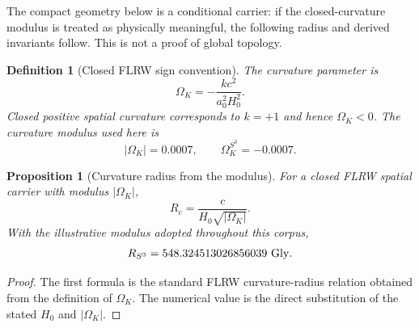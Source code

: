 \documentclass[11pt,a4paper]{article}
\newtheorem{proposition}[theorem]{Proposition}
\newtheorem{definition}[theorem]{Definition}
\begin{document}
The compact geometry below is a conditional carrier: if the closed-curvature modulus is treated as physically meaningful, the following radius and derived invariants follow.  This is not a proof of global topology.

\begin{definition}[Closed FLRW sign convention]
The curvature parameter is
\[
\Omega_K=-\frac{k c^2}{a_0^2H_0^2}.
\]
Closed positive spatial curvature corresponds to $k=+1$ and hence $\Omega_K<0$.  The curvature modulus used here is
\[
|\Omega_K|=0.0007,
\qquad
\Omega_K^{S^3}=-0.0007.
\]
\end{definition}

\begin{proposition}[Curvature radius from the modulus]
For a closed FLRW spatial carrier with modulus $|\Omega_K|$,
\[
R_c=\frac{c}{H_0\sqrt{|\Omega_K|}}.
\]
With the illustrative modulus adopted throughout this corpus,
\[
R_{S^3}=548.324513026856039\ {\rm Gly}.
\]
\end{proposition}
\begin{proof}
The first formula is the standard FLRW curvature-radius relation obtained from the definition of $\Omega_K$.  The numerical value is the direct substitution of the stated $H_0$ and $|\Omega_K|$.\end{proof}
\end{document}
